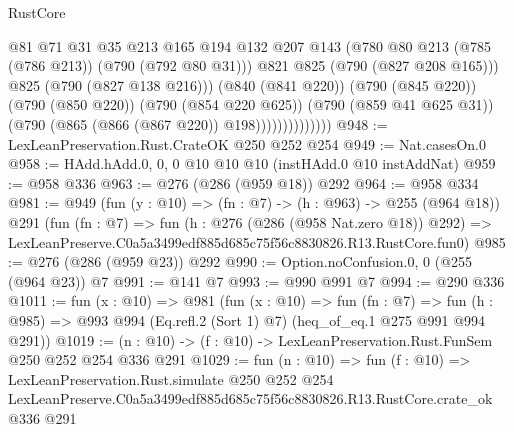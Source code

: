 \begin{lexlean}{RustCore}
\begin{coremodule}
                                @81
                                @71
                                @31
                                @35
                                @213
                                @165
                                @194
                                @132
                                @207
                                @143
                                (@780 @80 @213 (@785 (@786 @213)) (@790 (@792 @80 @31)))
                                @821
                                @825
                                (@790 (@827 @208 @165)))
                              @825
                              (@790 (@827 @138 @216)))
                            (@840 (@841 @220))
                            (@790 (@845 @220))
                            (@790 (@850 @220))
                            (@790 (@854 @220 @625))
                            (@790 (@859 @41 @625 @31))
                            (@790 (@865 (@866 (@867 @220)) @198))))))))))))))
@948 := LexLeanPreservation.Rust.CrateOK @250 @252 @254
@949 := Nat.casesOn.{0}
@958 := HAdd.hAdd.{0, 0, 0} @10 @10 @10 (instHAdd.{0} @10 instAddNat)
@959 := @958 @336
@963 := @276 (@286 (@959 @18)) @292
@964 := @958 @334
@981 := @949
    (fun (y : @10) => (fn : @7) -> (h : @963) -> @255 (@964 @18))
    @291
    (fun (fn : @7) =>
    fun (h : @276 (@286 (@958 Nat.zero @18)) @292) =>
    LexLeanPreserve.C0a5a3499edf885d685c75f56c8830826.R13.RustCore.fun0)
@985 := @276 (@286 (@959 @23)) @292
@990 := Option.noConfusion.{0, 0} (@255 (@964 @23)) @7
@991 := @141 @7
@993 := @990 @991 @7
@994 := @290 @336
@1011 := fun (x : @10) =>
  @981
    (fun (x : @10) =>
    fun (fn : @7) =>
    fun (h : @985) => @993 @994 (Eq.refl.{2} (Sort 1) @7) (heq_of_eq.{1} @275 @991 @994 @291))
@1019 := (n : @10) -> (f : @10) -> LexLeanPreservation.Rust.FunSem @250 @252 @254 @336 @291
@1029 := fun (n : @10) =>
  fun (f : @10) =>
  LexLeanPreservation.Rust.simulate
    @250
    @252
    @254
    LexLeanPreserve.C0a5a3499edf885d685c75f56c8830826.R13.RustCore.crate_ok
    @336
    @291
\end{coremodule}
\end{lexlean}
